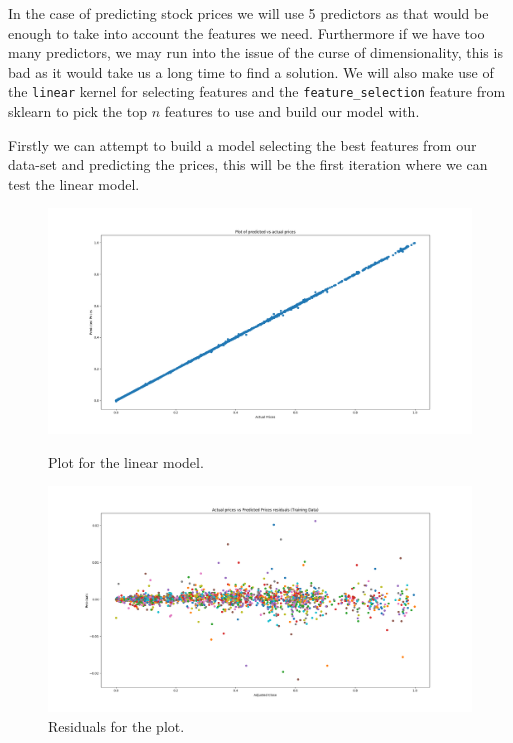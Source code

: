 \documentclass[11pt]{report}
\begin{document}
\noindent
In the case of predicting stock prices we will use 5 predictors as that would be enough to take into account the features we need. Furthermore if we have too many predictors, we may run into the issue of the curse of dimensionality, this is bad as it would take us a long time to find a solution. We will also make use of the \texttt{linear} kernel for selecting features and the \texttt{feature\_selection} feature from sklearn to pick the top $n$ features to use and build our model with.

\vspace{0.3cm}
\noindent
Firstly we can attempt to build a model selecting the best features from our data-set and predicting the prices, this will be the first iteration where we can test the linear model. 

\begin{figure}[ht]
\begin{minipage}[b]{.5\textwidth}
\centering
\includegraphics[width=1\textwidth]{plot1.png}
\caption{Plot for the linear model.}
\end{minipage}
\hfill
\begin{minipage}[b]{.5\textwidth}
\centering
\includegraphics[width=1\textwidth]{resid1.png}
\caption{Residuals for the plot.}
\end{minipage}
\end{figure}
\end{document}
